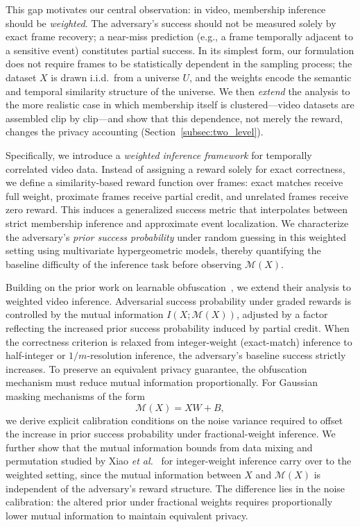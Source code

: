 \documentclass[sigconf,anonymous, review]{acmart}
\begin{document}
This gap motivates our central observation: in video, membership inference should be \emph{weighted}. The adversary's success should not be measured solely by exact frame recovery; a near-miss prediction (e.g., a frame temporally adjacent to a sensitive event) constitutes partial success. In its simplest form, our formulation does not require frames to be statistically dependent in the sampling process; the dataset $X$ is drawn i.i.d.\ from a universe $U$, and the weights encode the semantic and temporal similarity structure of the universe. We then \emph{extend} the analysis to the more realistic case in which membership itself is clustered---video datasets are assembled clip by clip---and show that this dependence, not merely the reward, changes the privacy accounting (Section~\ref{subsec:two_level}).

Specifically, we introduce a \emph{weighted inference framework} for temporally correlated video data. Instead of assigning a reward solely for exact correctness, we define a similarity-based reward function over frames: exact matches receive full weight, proximate frames receive partial credit, and unrelated frames receive zero reward. This induces a generalized success metric that interpolates between strict membership inference and approximate event localization. We characterize the adversary's \emph{prior success probability} under random guessing in this weighted setting using multivariate hypergeometric models, thereby quantifying the baseline difficulty of the inference task before observing $\mathcal{M}(X)$.

Building on the prior work on learnable obfuscation~\cite{xiao2024formal}, we extend their analysis to weighted video inference. Adversarial success probability under graded rewards is controlled by the mutual information $I(X; \mathcal{M}(X))$, adjusted by a factor reflecting the increased prior success probability induced by partial credit. When the correctness criterion is relaxed from integer-weight (exact-match) inference to half-integer or $1/m$-resolution inference, the adversary's baseline success strictly increases. To preserve an equivalent privacy guarantee, the obfuscation mechanism must reduce mutual information proportionally. For Gaussian masking mechanisms of the form
\[
\mathcal{M}(X) = XW + B,
\]
we derive explicit calibration conditions on the noise variance required to offset the increase in prior success probability under fractional-weight inference. We further show that the mutual information bounds from data mixing and permutation studied by Xiao \textit{et al.}~\cite{xiao2024formal} for integer-weight inference carry over to the weighted setting, since the mutual information between $X$ and $\mathcal{M}(X)$ is independent of the adversary's reward structure. The difference lies in the noise calibration: the altered prior under fractional weights requires proportionally lower mutual information to maintain equivalent privacy.
\end{document}
